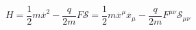 \begin{equation}
H=\frac{1}{2}m\stackrel{.}{x}^{2}-\frac{q}{2m}F\mathcal{S}=\frac{1}{2}m%
\stackrel{.}{x}^{\mu }\stackrel{.}{x}_{\mu }-\frac{q}{2m}F^{\mu \nu }%
\mathcal{S}_{\mu \nu }
\end{equation}


